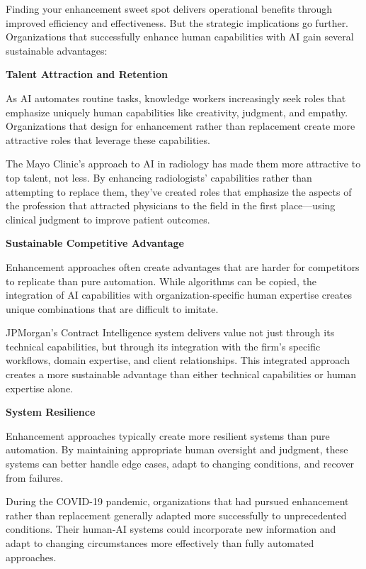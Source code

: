 \documentclass[
  Letterpaper,
]{scrbook}
\begin{document}
Finding your enhancement sweet spot delivers operational benefits
through improved efficiency and effectiveness. But the strategic
implications go further. Organizations that successfully enhance human
capabilities with AI gain several sustainable advantages:

\textbf{Talent Attraction and Retention}

As AI automates routine tasks, knowledge workers increasingly seek roles
that emphasize uniquely human capabilities like creativity, judgment,
and empathy. Organizations that design for enhancement rather than
replacement create more attractive roles that leverage these
capabilities.

The Mayo Clinic's approach to AI in radiology has made them more
attractive to top talent, not less. By enhancing radiologists'
capabilities rather than attempting to replace them, they've created
roles that emphasize the aspects of the profession that attracted
physicians to the field in the first place---using clinical judgment to
improve patient outcomes.

\textbf{Sustainable Competitive
Advantage}

Enhancement approaches often create advantages that are harder for
competitors to replicate than pure automation. While algorithms can be
copied, the integration of AI capabilities with organization-specific
human expertise creates unique combinations that are difficult to
imitate.

JPMorgan's Contract Intelligence system delivers value not just through
its technical capabilities, but through its integration with the firm's
specific workflows, domain expertise, and client relationships. This
integrated approach creates a more sustainable advantage than either
technical capabilities or human expertise alone.

\textbf{System Resilience}

Enhancement approaches typically create more resilient systems than pure
automation. By maintaining appropriate human oversight and judgment,
these systems can better handle edge cases, adapt to changing
conditions, and recover from failures.

During the COVID-19 pandemic, organizations that had pursued enhancement
rather than replacement generally adapted more successfully to
unprecedented conditions. Their human-AI systems could incorporate new
information and adapt to changing circumstances more effectively than
fully automated approaches.
\end{document}
